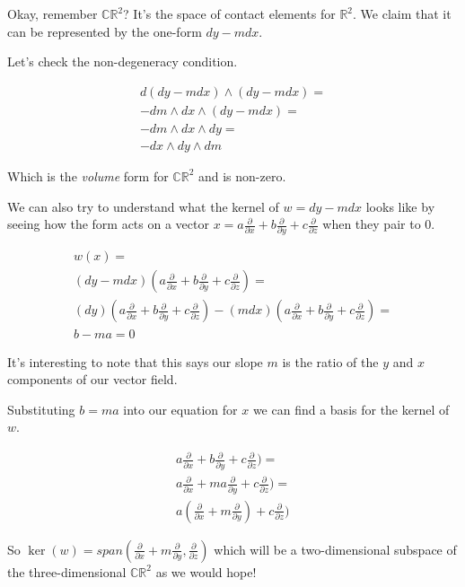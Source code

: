 \documentclass{article}
\begin{document}
Okay, remember $\mathbb{CR}^{2}$? It's the space of contact elements for
$\mathbb{R}^2$. We claim that it can be represented by the one-form $dy - mdx$.

Let's check the non-degeneracy condition.

\begin{align*}
  d (dy - mdx) \wedge (dy - mdx) = \\
  -dm \wedge dx \wedge (dy - mdx) = \\
  -dm \wedge dx \wedge dy = \\
  -dx \wedge dy \wedge dm
\end{align*}

Which is the \textit{volume} form for $\mathbb{CR}^{2}$ and is non-zero.

We can also try to understand what the kernel of $w = dy - mdx$ looks like by seeing
how the form acts on a vector $x = a\frac{\partial}{\partial x} +
b\frac{\partial}{\partial y} + c\frac{\partial}{\partial z}$ when they pair to 0.

\begin{align*}
  w (x) = \\
  (dy - mdx) (a\frac{\partial}{\partial x} +
  b\frac{\partial}{\partial y} + c\frac{\partial}{\partial z}) = \\
  (dy)(a\frac{\partial}{\partial x} +
b\frac{\partial}{\partial y} + c\frac{\partial}{\partial z}) - (mdx)(a\frac{\partial}{\partial x} +
b\frac{\partial}{\partial y} + c\frac{\partial}{\partial z}) = \\
  b - ma = 0
\end{align*}

It's interesting to note that this says our slope $m$ is the ratio of the $y$
and $x$ components of our vector field.

Substituting $b = ma$ into our equation for $x$ we can find a basis for the
kernel of $w$.

\begin{align*}
  a\frac{\partial}{\partial x} +
    b\frac{\partial}{\partial y} + c\frac{\partial}{\partial z}) = \\
  a\frac{\partial}{\partial x} +
    ma\frac{\partial}{\partial y} + c\frac{\partial}{\partial z}) = \\
  a(\frac{\partial}{\partial x} +
    m\frac{\partial}{\partial y}) + c\frac{\partial}{\partial z}) 
\end{align*}

So $\ker(w) = span(\frac{\partial}{\partial x} +
    m\frac{\partial}{\partial y}, \frac{\partial}{\partial z})$ which will be a
two-dimensional subspace of the three-dimensional $\mathbb{CR}^{2}$ as we would hope!
\end{document}
